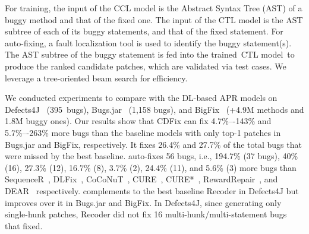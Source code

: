 For training, the input of the CCL model is the Abstract Syntax Tree
(AST) of a buggy method and that of the fixed one.
The input of the CTL model is the AST subtree of each of its buggy
statements, and that of the fixed statement. For
auto-fixing, a fault localization tool is used to identify the buggy
statement(s). The AST subtree of the buggy statement is fed into the
trained~CTL model~to produce the ranked candidate patches, which are
validated via test cases. We leverage a tree-oriented beam search for
efficiency.


We conducted experiments to compare {\tool} with the DL-based APR
models on Defects4J~\cite{defects4j} (395~bugs),
Bugs.jar~\cite{saha2018bugs} (1,158 bugs), and
BigFix~\cite{yioopsla19} (+4.9M methods and 1.8M buggy ones).
%
Our results show that CDFix can fix 4.7\%–-143\% and 5.7\%–-263\% more
bugs than the baseline models with only top-1 patches in Bugs.jar and
BigFix, respectively. It fixes 26.4\% and 27.7\% of the total bugs
that were missed by the best baseline. {\tool} auto-fixes 56 bugs,
i.e., 194.7\% (37 bugs), 40\% (16), 27.3\% (12), 16.7\% (8), 3.7\%
(2), 24.4\% (11), and 5.6\% (3) more bugs than
SequenceR~\cite{chen2018sequencer}, DLFix~\cite{icse20},
CoCoNuT~\cite{lutellier2020coconut}, CURE~\cite{cure-icse21},
CURE*~\cite{cure-icse21}, RewardRepair~\cite{monperrus-icse22}, and
DEAR~\cite{icse22} respectively.
{\tool} complements to the best baseline Recoder in Defects4J but
improves over it in Bugs.jar and BigFix. In Defects4J, since
generating only single-hunk patches, Recoder did not fix 16
multi-hunk/multi-statement bugs that {\tool} fixed.


